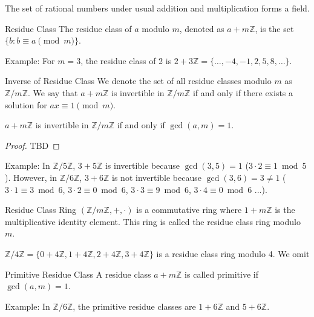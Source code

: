 \documentclass{article}
\begin{document}
The set of rational numbers under usual addition and multiplication forms a field.

\begin{definition}{Residue Class}{}
The residue class of $a$ modulo $m$, denoted as $a + m\mathbb{Z}$, is the set $\{b : b \equiv a \pmod{m}\}$.
\end{definition}

Example: For $m = 3$, the residue class of 2 is $2 + 3\mathbb{Z} = \{\ldots, -4, -1, 2, 5, 8, \ldots\}$.

\begin{definition}{Inverse of Residue Class}{}
We denote the set of all residue classes modulo $m$ as $\mathbb{Z} / m\mathbb{Z}$. We say that $a + m\mathbb{Z}$ is invertible in $\mathbb{Z} / m\mathbb{Z}$ if and only if there exists a solution for $ax \equiv 1 \pmod{m}$.
\end{definition}

\begin{theorem}{}{}
$a + m\mathbb{Z}$ is invertible in $\mathbb{Z} / m\mathbb{Z}$ if and only if $\gcd(a, m) = 1$.
\end{theorem}

\begin{proof}
    TBD
\end{proof}

Example: In $\mathbb{Z}/5\mathbb{Z}$, $3 + 5\mathbb{Z}$ is invertible because $\gcd(3, 5) = 1$ ($3\cdot2 \equiv 1 \bmod 5$). However, in $\mathbb{Z}/6\mathbb{Z}$, $3 + 6\mathbb{Z}$ is not invertible because $\gcd(3, 6) = 3 \neq 1$ ($3 \cdot 1 \equiv 3 \bmod 6$, $3 \cdot 2 \equiv 0 \bmod 6$, $3 \cdot 3 \equiv 9 \bmod 6$, $3 \cdot 4 \equiv 0 \bmod 6$ ...).

\begin{definition}{Residue Class Ring}{}
$(\mathbb{Z} / m \mathbb{Z}, +, \cdot)$ is a commutative ring where $1 + m \mathbb{Z}$ is the multiplicative identity element. This ring is called the residue class ring modulo $m$.
\end{definition}

$\mathbb{Z}/4\mathbb{Z} = \{0 + 4\mathbb{Z}, 1 + 4\mathbb{Z}, 2 + 4\mathbb{Z}, 3 + 4\mathbb{Z}\}$ is a residue class ring modulo 4. We omit 

\begin{definition}{Primitive Residue Class}{}
A residue class $a + m\mathbb{Z}$ is called primitive if $\gcd(a, m) = 1$.
\end{definition}

Example: In $\mathbb{Z}/6\mathbb{Z}$, the primitive residue classes are $1 + 6\mathbb{Z}$ and $5 + 6\mathbb{Z}$.
\end{document}
